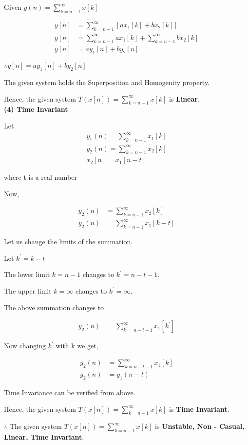 \documentclass[journal,12pt,twocolumn]{IEEEtran}
\begin{document}
Given $y(n) = \sum_{k = n - 1}^{\infty} x[k]$

\begin{align}
    y[n] &= \sum_{k = n - 1}^{\infty} [ax_1[k] + bx_2[k]] \\
    y[n] &= \sum_{k = n - 1}^{\infty} ax_1[k] + \sum_{k = n - 1}^{\infty} bx_2[k] \\
    y[n] &= ay_1[n] + by_2[n]
\end{align}

$\therefore y[n] = ay_1[n] + by_2[n]$

The given system holds the Superposition and Homogenity property.

Hence, the given system $T(x[n]) = \sum_{k = n - 1}^{\infty} x[k]$ is \textbf{Linear}. \\

\textbf{(4) Time Invariant}

Let 
\begin{align*}
    y_1(n) = \sum_{k = n - 1}^{\infty} x_1[k] \\ 
    y_2(n) = \sum_{k = n - 1}^{\infty} x_2[k] \\
    x_2[n] = x_1[n - t]
\end{align*}

where t is a real number

Now,

\begin{align}
    y_2(n) &= \sum_{k = n - 1}^{\infty} x_2[k] \\
    y_2(n) &= \sum_{k = n - 1}^{\infty} x_1[k - t]
\end{align}

Let us change the limits of the summation.

Let $k^{'} = k - t$

The lower limit $k = n - 1$ changes to $k^{'} = n - t - 1$.

The upper limit $k = \infty$ changes to $k^{'} = \infty$.

The above summation changes to 

\begin{align}
    y_2(n) &= \sum_{k^{'} = n - t - 1}^{\infty} x_1[k^{'}]
\end{align}

Now changing $k^{'}$ with k we get,

\begin{align}
    y_2(n) &= \sum_{k = n - t - 1}^{\infty} x_1[k] \\
    y_2(n) &= y_1(n-t)
\end{align}

Time Invariance can be verified from above.


Hence, the given system $T(x[n]) = \sum_{k = n - 1}^{\infty} x[k]$ is \textbf{Time Invariant}.

$\therefore$ The given system $T(x[n]) = \sum_{k = n - 1}^{\infty} x[k]$ is \textbf{Unstable, Non - Casual, Linear, Time Invariant}.
\end{document}

